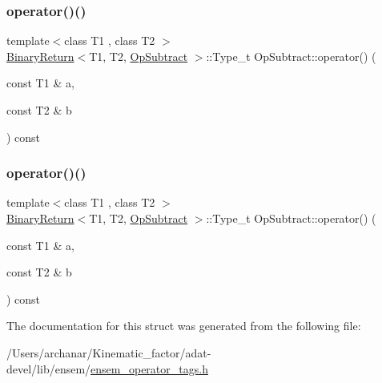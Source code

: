 \mbox{\label{structOpSubtract_a977cd29c1df947e7958b86dd98eee321}} 
\subsubsection{\texorpdfstring{operator()()}{operator()()}\hspace{0.1cm}{\footnotesize\ttfamily [2/3]}}
{\footnotesize\ttfamily template$<$class T1 , class T2 $>$ \\
\mbox{\hyperlink{structBinaryReturn}{Binary\+Return}}$<$T1, T2, \mbox{\hyperlink{structOpSubtract}{Op\+Subtract}} $>$\+::Type\+\_\+t Op\+Subtract\+::operator() (\begin{DoxyParamCaption}\item[{const T1 \&}]{a,  }\item[{const T2 \&}]{b }\end{DoxyParamCaption}) const\hspace{0.3cm}{\ttfamily [inline]}}

\mbox{\label{structOpSubtract_a977cd29c1df947e7958b86dd98eee321}} 
\subsubsection{\texorpdfstring{operator()()}{operator()()}\hspace{0.1cm}{\footnotesize\ttfamily [3/3]}}
{\footnotesize\ttfamily template$<$class T1 , class T2 $>$ \\
\mbox{\hyperlink{structBinaryReturn}{Binary\+Return}}$<$T1, T2, \mbox{\hyperlink{structOpSubtract}{Op\+Subtract}} $>$\+::Type\+\_\+t Op\+Subtract\+::operator() (\begin{DoxyParamCaption}\item[{const T1 \&}]{a,  }\item[{const T2 \&}]{b }\end{DoxyParamCaption}) const\hspace{0.3cm}{\ttfamily [inline]}}



The documentation for this struct was generated from the following file\+:\begin{DoxyCompactItemize}
\item 
/\+Users/archanar/\+Kinematic\+\_\+factor/adat-\/devel/lib/ensem/\mbox{\hyperlink{adat-devel_2lib_2ensem_2ensem__operator__tags_8h}{ensem\+\_\+operator\+\_\+tags.\+h}}\end{DoxyCompactItemize}
